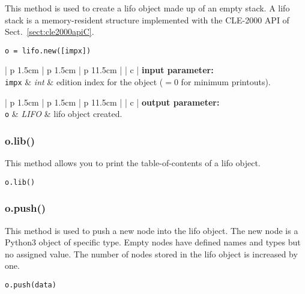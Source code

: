 This method is used to create a {\sc lifo} object made up of an empty stack. A {\sc lifo} stack is a memory-resident structure
implemented with the CLE-2000 API of Sect.~\ref{sect:cle2000apiC}. 

\begin{verbatim}
o = lifo.new([impx])
\end{verbatim}

\noindent
\begin{tabular} {| p {1.5cm} | p {1.5cm} | p {11.5cm} |}
\hline
{} {| c |} {\bf input parameter:} \\
\hline
{\tt impx} & {\it int}  & edition index for the object ($=0$ for minimum printouts). \\
\hline
\end{tabular}

\vskip 0.8cm

\noindent
\begin{tabular} {| p {1.5cm} | p {1.5cm} | p {11.5cm} |}
\hline
{} {| c |} {\bf output parameter:} \\
\hline
{\tt o} & {\it LIFO} & {\sc lifo} object created. \\
\hline
\end{tabular}

\vskip 0.4cm

\subsubsection{o.lib()}

This method allows you to print the table-of-contents of a {\sc lifo} object.

\begin{verbatim}
o.lib()
\end{verbatim}

\vskip 0.4cm

\subsubsection{o.push()}

This method is used to push a new node into the {\sc lifo} object. The new node is a Python3 object of specific type. Empty nodes have defined names and types but no assigned value.  The number of nodes stored in the {\sc lifo} object is increased by one.

\begin{verbatim}
o.push(data)
\end{verbatim}

